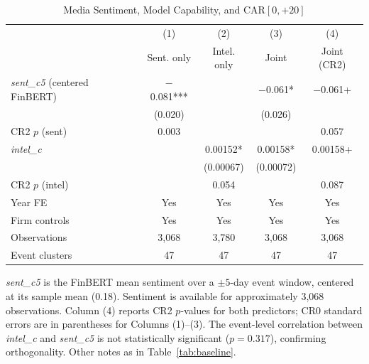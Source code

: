 \documentclass[12pt]{article}
\begin{document}
\begin{table}[htbp]
\centering
\caption{Media Sentiment, Model Capability, and CAR$[0,{+}20]$}
\label{tab:sentiment}
\begin{threeparttable}
\begin{tabular}{lcccc}
\toprule
 & (1) & (2) & (3) & (4) \\
 & Sent. only & Intel. only & Joint & Joint (CR2) \\
\midrule
\textit{sent\_c5} (centered FinBERT) & $-$0.081*** & & $-$0.061* & $-$0.061+ \\
 & (0.020) & & (0.026) & \\[2pt]
CR2 $p$ (sent) & 0.003 & & & 0.057 \\[6pt]
\textit{intel\_c} & & 0.00152* & 0.00158* & 0.00158+ \\
 & & (0.00067) & (0.00072) & \\[2pt]
CR2 $p$ (intel) & & 0.054 & & 0.087 \\[6pt]
\midrule
Year FE & Yes & Yes & Yes & Yes \\
Firm controls & Yes & Yes & Yes & Yes \\
Observations & 3,068 & 3,780 & 3,068 & 3,068 \\
Event clusters & 47 & 47 & 47 & 47 \\
\bottomrule
\end{tabular}
\begin{tablenotes}[flushleft]\footnotesize
\item \textit{sent\_c5} is the FinBERT mean sentiment over a $\pm 5$-day event
window, centered at its sample mean (0.18). Sentiment is available for
approximately 3,068 observations. Column (4) reports CR2 $p$-values for both
predictors; CR0 standard errors are in parentheses for Columns (1)--(3).
The event-level correlation between \textit{intel\_c} and \textit{sent\_c5}
is not statistically significant ($p = 0.317$), confirming orthogonality.
Other notes as in Table~\ref{tab:baseline}.
\end{tablenotes}
\end{threeparttable}
\end{table}
\end{document}

